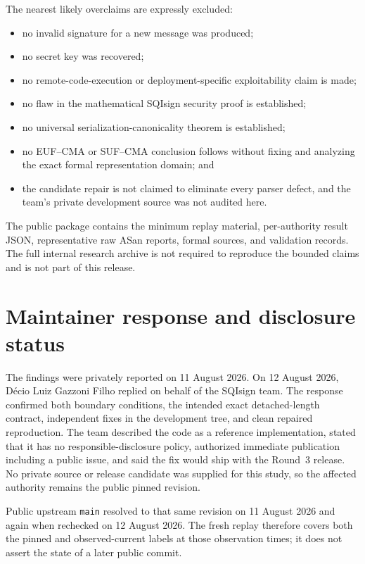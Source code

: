 \documentclass[11pt]{article}
\newcommand{\code}[1]{\texttt{#1}}
\begin{document}
The nearest likely overclaims are expressly excluded:

\begin{itemize}
  \item no invalid signature for a new message was produced;
  \item no secret key was recovered;
  \item no remote-code-execution or deployment-specific exploitability claim
        is made;
  \item no flaw in the mathematical SQIsign security proof is established;
  \item no universal serialization-canonicality theorem is established;
  \item no EUF--CMA or SUF--CMA conclusion follows without fixing and analyzing
        the exact formal representation domain; and
  \item the candidate repair is not claimed to eliminate every parser defect,
        and the team's private development source was not audited here.
\end{itemize}

The public package contains the minimum replay material, per-authority result
JSON, representative raw ASan reports, formal sources, and validation records.
The full internal research archive is not required to reproduce the bounded
claims and is not part of this release.

\section{Maintainer response and disclosure status}

The findings were privately reported on 11 August 2026.  On 12 August 2026,
Décio Luiz Gazzoni Filho replied on behalf of the SQIsign team.  The response
confirmed both boundary conditions, the intended exact detached-length
contract, independent fixes in the development tree, and clean repaired
reproduction.  The team described the code as a reference implementation,
stated that it has no responsible-disclosure policy, authorized immediate
publication including a public issue, and said the fix would ship with the
Round~3 release.  No private source or release candidate was supplied for this
study, so the affected authority remains the public pinned revision.

Public upstream \code{main} resolved to that same revision on 11 August 2026
and again when rechecked on 12 August 2026.  The fresh replay therefore covers
both the pinned and observed-current labels at those observation times; it
does not assert the state of a later public commit.
\end{document}
